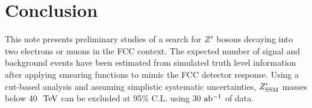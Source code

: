 \documentclass{cernrep}
\begin{document}
\section{Conclusion}
This note presents preliminary studies of a search for $Z^{\prime}$ 
bosons decaying into two electrons or muons in the FCC context. The expected number 
of signal and background events have been estimated from simulated truth level information 
after applying smearing functions to mimic the FCC detector response.
Using a cut-based analysis and assuming simplistic systematic uncertainties, $Z^{\prime}_{\mathrm{SSM}}$
masses below 40 $\TeV$ can be excluded at 95$\%$ C.L. 
using 30 $\mbox{ab$^{-1}$}{}$ of data. 



\end{document}
